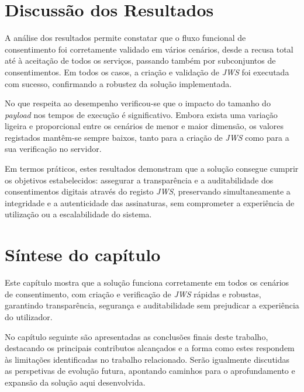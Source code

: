\section{Discussão dos Resultados}

A análise dos resultados permite constatar que o fluxo funcional de consentimento foi corretamente validado em vários cenários, desde a recusa total até à aceitação de todos os serviços, passando também por subconjuntos de consentimentos. Em todos os casos, a criação e validação de \textit{JWS} foi executada com sucesso, confirmando a robustez da solução implementada.

No que respeita ao desempenho verificou-se que o impacto do tamanho do \textit{payload} nos tempos de execução é significativo. Embora exista uma variação ligeira e proporcional entre os cenários de menor e maior dimensão, os valores registados mantêm-se sempre baixos, tanto para a criação de \textit{JWS} como para a sua verificação no servidor.

Em termos práticos, estes resultados demonstram que a solução consegue cumprir os objetivos estabelecidos: assegurar a transparência e a auditabilidade dos consentimentos digitais através do registo \textit{JWS}, preservando simultaneamente a integridade e a autenticidade das assinaturas, sem comprometer a experiência de utilização ou a escalabilidade do sistema.

\section {Síntese do capítulo}

Este capítulo mostra que a solução funciona corretamente em todos os cenários de consentimento, com criação e verificação de \textit{JWS} rápidas e robustas, garantindo transparência, segurança e auditabilidade sem prejudicar a experiência do utilizador.

No capítulo seguinte são apresentadas as conclusões finais deste trabalho, destacando os principais contributos alcançados e a forma como estes respondem às limitações identificadas no trabalho relacionado. Serão igualmente discutidas as perspetivas de evolução futura, apontando caminhos para o aprofundamento e expansão da solução aqui desenvolvida.
